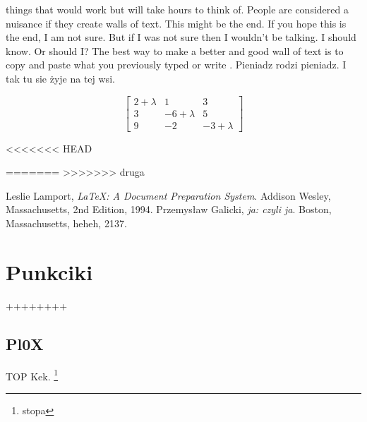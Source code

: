 \documentclass[11pt]{article}
\begin{document}
\begin{center}
things that would work but will take hours to think of. People are considered a nuisance if they create walls of text. This might be the end. If you hope this is the end, I am not sure. But if I was not sure then I wouldn't be talking. I should know. Or should I? The best way to make a better and good wall of text is to copy and paste what you previously typed or write
.\cite{Galicki96} Pieniadz rodzi pieniadz. I tak tu sie żyje na tej wsi.
\end{center}
\newpage
$$\left[\begin{array}{ccc}
2+\lambda&1&3\\
3&-6+\lambda&5\\
9&-2&-3+\lambda
\end{array}\right]$$




<<<<<<< HEAD

=======
%
>>>>>>> druga

\begin{thebibliography}{9}

  Leslie Lamport,
  \emph{\LaTeX: A Document Preparation System}.
  Addison Wesley, Massachusetts,
  2nd Edition,
  1994.
  Przemysław Galicki,
  \emph{ja: czyli ja}.
  Boston, Massachusetts,
  heheh,
  2137.

\end{thebibliography}

\section{Punkciki}

++++++++

\subsection{Pl0X}

TOP Kek.
\footnote{stopa}
\end{document}
